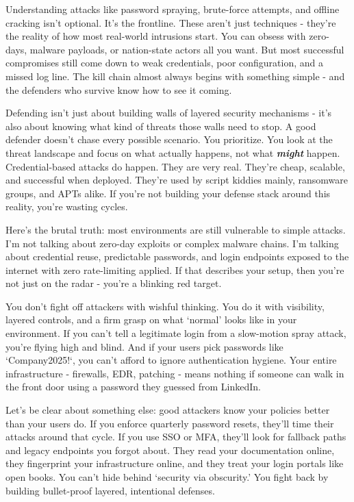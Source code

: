 Understanding attacks like password spraying, brute-force attempts, and offline cracking isn’t optional. It’s the frontline. These aren’t just techniques - they’re the reality of how most real-world intrusions start. You can obsess with zero-days, malware payloads, or nation-state actors all you want. But most successful compromises still come down to weak credentials, poor configuration, and a missed log line. The kill chain almost always begins with something simple - and the defenders who survive know how to see it coming.

Defending isn’t just about building walls of layered security mechanisms - it’s also about knowing what kind of threats those walls need to stop. A good defender doesn’t chase every possible scenario. You prioritize. You look at the threat landscape and focus on what actually happens, not what \textit{\textbf{might}} happen. Credential-based attacks do happen. They are very real. They’re cheap, scalable, and successful when deployed. They’re used by script kiddies mainly, ransomware groups, and APTs alike. If you’re not building your defense stack around this reality, you’re wasting cycles.

Here’s the brutal truth: most environments are still vulnerable to simple attacks. I’m not talking about zero-day exploits or complex malware chains. I’m talking about credential reuse, predictable passwords, and login endpoints exposed to the internet with zero rate-limiting applied. If that describes your setup, then you’re not just on the radar - you’re a blinking red target.

You don’t fight off attackers with wishful thinking. You do it with visibility, layered controls, and a firm grasp on what ‘normal’ looks like in your environment. If you can’t tell a legitimate login from a slow-motion spray attack, you’re flying high and blind. And if your users pick passwords like `Company2025!`, you can’t afford to ignore authentication hygiene. Your entire infrastructure - firewalls, EDR, patching - means nothing if someone can walk in the front door using a password they guessed from LinkedIn.

Let’s be clear about something else: good attackers know your policies better than your users do. If you enforce quarterly password resets, they’ll time their attacks around that cycle. If you use SSO or MFA, they’ll look for fallback paths and legacy endpoints you forgot about. They read your documentation online, they fingerprint your infrastructure online, and they treat your login portals like open books. You can’t hide behind ‘security via obscurity.’ You fight back by building bullet-proof layered, intentional defenses.

